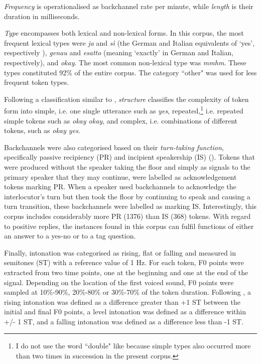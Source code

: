 \textit{Frequency} is operationalised as backchannel rate per minute, while \textit{length} is their duration in milliseconds.

\textit{Type} encompasses both lexical and non-lexical forms. In this corpus, the most frequent lexical types were \textit{ja} and \textit{sì} (the German and Italian equivalents of ‘yes’, respectively ), \textit{genau} and \textit{esatto} (meaning ‘exactly’ in German and Italian, respectively), and \textit{okay}. The most common non-lexical type was \textit{mmhm}. These types constituted 92\% of the entire corpus. The category ``other" was used for less frequent token types.

Following a classification similar to \citet{Tottie1991}, \textit{structure} classifies the complexity of token form into simple, i.e. one single utterance such as \textit{yes}, repeated,\footnote{I do not use the word ``double" like \citet{Tottie1991} because simple types also occurred more than two times in succession in the present corpus.} i.e. repeated simple tokens such as \textit{okay okay}, and complex, i.e. combinations of different tokens, such as \textit{okay yes}.

Backchannels were also categorised based on their \textit{turn-taking function}, specifically passive recipiency (PR) and incipient speakership (IS) (\citealt{Savino2010,Savino2011,Savino2014}). Tokens that were produced without the speaker taking the floor and simply as signals to the primary speaker that they may continue, were labelled as acknowledgement tokens marking PR. When a speaker used backchannels to acknowledge the interlocutor’s turn but then took the floor by continuing to speak and causing a turn transition, these backchannels were labelled as marking IS. Interestingly, this corpus includes considerably more PR (1376) than IS (368) tokens. With regard to positive replies, the instances found in this corpus can fulfil functions of either an answer to a yes-no or to a tag question.

Finally, intonation was categorised as rising, flat or falling and measured in semitones (ST) with a reference value of 1 Hz. For each token, F0 points were extracted from two time points, one at the beginning and one at the end of the signal. Depending on the location of the first voiced sound, F0 points were sampled at 10\%-90\%, 20\%-80\% or 30\%-70\% of the token duration. Following \citet{Wehrle2023}, a rising intonation was defined as a difference greater than +1 ST between the initial and final F0 points, a level intonation was defined as a difference within +/- 1 ST, and a falling intonation was defined as a difference less than -1 ST.




